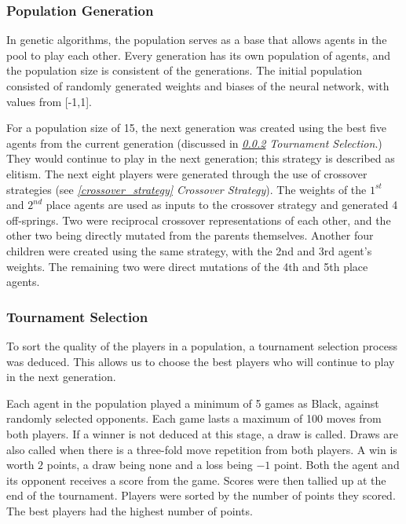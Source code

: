 \documentclass[12pt,a4paper]{article}
\begin{document}
        \subsubsection{Population Generation} \label{population_generation}
            In genetic algorithms, the population serves as a base that allows agents in the pool to play each other. Every generation has its own population of agents, and the population size is consistent of the generations. The initial population consisted of randomly generated weights and biases of the neural network, with values from [-1,1]. 
            
            For a population size of 15, the next generation was created using the best five agents from the current generation (discussed in {\it{\ref{tournament_selection} Tournament Selection}}.) They would continue to play in the next generation; this strategy is described as elitism. The next eight players were generated through the use of crossover strategies (see {\it{\ref{crossover_strategy} Crossover Strategy}}). The weights of the $1^{st}$ and $2^{nd}$ place agents are used as inputs to the crossover strategy and generated 4 off-springs. Two were reciprocal crossover representations of each other, and the other two being directly mutated from the parents themselves. Another four children were created using the same strategy, with the 2nd and 3rd agent's weights. The remaining two were direct mutations of the 4th and 5th place agents.

        \subsubsection{Tournament Selection} \label{tournament_selection}

            To sort the quality of the players in a population, a tournament selection process was deduced. This allows us to choose the best players who will continue to play in the next generation.

            Each agent in the population played a minimum of 5 games as Black, against randomly selected opponents. Each game lasts a maximum of 100 moves from both players. If a winner is not deduced at this stage, a draw is called. Draws are also called when there is a three-fold move repetition from both players. A win is worth $2$ points, a draw being none and a loss being $-1$ point. Both the agent and its opponent receives a score from the game.
            Scores were then tallied up at the end of the tournament. Players were sorted by the number of points they scored. The best players had the highest number of points.
  
\end{document}
